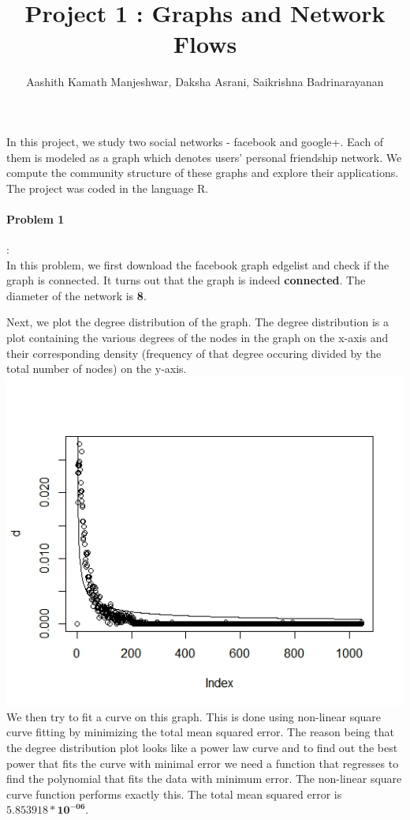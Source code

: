 \documentclass{article}
\title{Project 1 : Graphs and Network Flows}
\author{Aashith Kamath Manjeshwar, Daksha Asrani, Saikrishna Badrinarayanan}
\begin{document}
\maketitle

In this project, we study two social networks -  facebook and google+. Each of them is modeled as a graph which 
denotes users' personal friendship network. We compute 
the community structure of these graphs and explore their applications. The project was coded in the language R.

\paragraph{Problem 1}: \\
In this problem, we first download the facebook graph edgelist and check if the graph is connected.
It turns out that the graph is indeed \textbf{connected}. The diameter of the network is \textbf{8}.

Next, we plot the degree distribution of the graph. The degree distribution is a plot containing the various degrees of the nodes 
in the graph on the x-axis and their corresponding density (frequency of that degree occuring divided by the total number of nodes) on the y-axis.\\

\includegraphics[scale=0.4]{ques1a} \\

We then try to fit a curve on this graph. This is done using non-linear square curve fitting by minimizing the total mean 
squared error. The reason being that the degree distribution plot looks like a power law curve and to 
find out the best power that fits the 
curve with minimal error we need a  
function that regresses to find the polynomial that fits the data with minimum error. The non-linear square curve
function performs exactly this.
The total mean squared error is $\mathbf{5.853918 * 10^{-06}}$.
\end{document}
